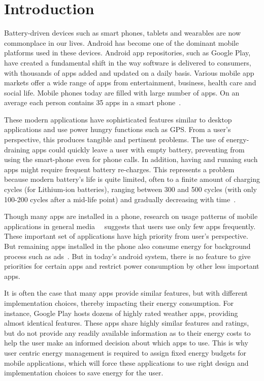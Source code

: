 \section{Introduction}

Battery-driven devices such as smart phones, tablets and wearables are now commonplace in our lives. Android has become one of the dominant mobile platforms used in these devices. Android app repositories, such as Google Play, have created a fundamental shift in the way software is delivered to consumers, with thousands of apps added and updated on a daily basis. Various mobile app markets offer a wide range of apps from entertainment, business, health care and social life. Mobile phones today are filled with large number of apps. On an average each person contains 35 apps in a smart phone~\cite{thinkwithgoogle}. 

These modern applications have sophisticated features similar to desktop applications and use power hungry functions such as GPS. From a user’s perspective, this produces tangible and pertinent problems. The use of energy-draining apps could quickly leave a user with empty battery, preventing from using the smart-phone even for phone calls. In addition, having and running such apps might require frequent battery re-charges. This represents a problem because modern battery’s life is quite limited, often to a finite amount of charging cycles (for Lithium-ion batteries), ranging between 300 and 500 cycles (with only 100-200 cycles after a mid-life point) and gradually decreasing with time~\cite{linares2014mining}.

Though many apps are installed in a phone, research on usage patterns of mobile applications in general media~\cite{techcrunch85}~\cite{techcrunch63} suggests that users use only few apps frequently. These important set of applications have high priority from user's perspective.
But remaining apps installed in the phone also consume energy for background process such as ads~\cite{stevens2012investigating}. But in today's android system, there is no feature to give priorities for certain apps and restrict power consumption by other less important apps. 

It is often the case that many apps provide similar features, but with different implementation choices, thereby impacting their energy consumption. For instance, Google Play hosts dozens of highly rated weather apps, providing almost identical features. These apps share highly similar features and ratings, but do not provide any readily available information as to their energy costs to help the user make an informed decision about which apps to use. This is why user centric energy management is required to assign fixed energy budgets for mobile applications, which will force these applications to use right design and implementation choices to save energy for the user.




